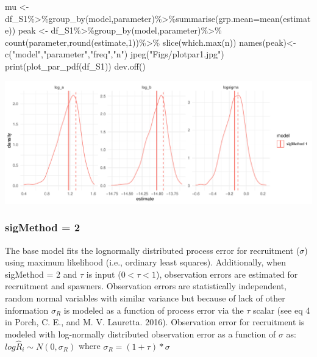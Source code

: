 \documentclass[
]{article}
\newenvironment{Shaded}{\begin{snugshade}}{\end{snugshade}}
\newcommand{\AttributeTok}[1]{\textcolor[rgb]{0.77,0.63,0.00}{#1}}
\newcommand{\DecValTok}[1]{\textcolor[rgb]{0.00,0.00,0.81}{#1}}
\newcommand{\FunctionTok}[1]{\textcolor[rgb]{0.00,0.00,0.00}{#1}}
\newcommand{\NormalTok}[1]{#1}
\newcommand{\OtherTok}[1]{\textcolor[rgb]{0.56,0.35,0.01}{#1}}
\newcommand{\SpecialCharTok}[1]{\textcolor[rgb]{0.00,0.00,0.00}{#1}}
\newcommand{\StringTok}[1]{\textcolor[rgb]{0.31,0.60,0.02}{#1}}
\begin{document}
\begin{Shaded}
\begin{Highlighting}[]
\NormalTok{  mu   }\OtherTok{\textless{}{-}}\NormalTok{ df\_S1}\SpecialCharTok{\%\textgreater{}\%}\FunctionTok{group\_by}\NormalTok{(model,parameter)}\SpecialCharTok{\%\textgreater{}\%}\FunctionTok{summarise}\NormalTok{(}\AttributeTok{grp.mean=}\FunctionTok{mean}\NormalTok{(estimate))}
\NormalTok{  peak }\OtherTok{\textless{}{-}}\NormalTok{ df\_S1}\SpecialCharTok{\%\textgreater{}\%}\FunctionTok{group\_by}\NormalTok{(model,parameter)}\SpecialCharTok{\%\textgreater{}\%}
    \FunctionTok{count}\NormalTok{(parameter,}\FunctionTok{round}\NormalTok{(estimate,}\DecValTok{1}\NormalTok{))}\SpecialCharTok{\%\textgreater{}\%}
    \FunctionTok{slice}\NormalTok{(}\FunctionTok{which.max}\NormalTok{(n))}
  \FunctionTok{names}\NormalTok{(peak)}\OtherTok{\textless{}{-}} \FunctionTok{c}\NormalTok{(}\StringTok{"model"}\NormalTok{,}\StringTok{"parameter"}\NormalTok{,}\StringTok{"freq"}\NormalTok{,}\StringTok{"n"}\NormalTok{)}
 \FunctionTok{jpeg}\NormalTok{(}\StringTok{"Figs/plotpar1.jpg"}\NormalTok{)}
 \FunctionTok{print}\NormalTok{(}\FunctionTok{plot\_par\_pdf}\NormalTok{(df\_S1))}
 \FunctionTok{dev.off}\NormalTok{()}
\end{Highlighting}
\end{Shaded}

\includegraphics{futR_demo_files/figure-latex/plot1-1.pdf}

\hypertarget{sigmethod-2-1}{%
\subsubsection{sigMethod = 2}\label{sigmethod-2-1}}

The base model fits the lognormally distributed process error for
recruitment (\(\sigma\)) using maximum likelihood (i.e., ordinary least
squares). Additionally, when sigMethod = 2 and \(\tau\) is input
(\(0<\tau<1\)), observation errors are estimated for recruitment and
spawners. Observation errors are statistically independent, random
normal variables with similar variance but because of lack of other
information \(\sigma_R\) is modeled as a function of process error via
the \(\tau\) scalar (see eq 4 in Porch, C. E., and M. V. Lauretta.
2016). Observation error for recruitment is modeled with log-normally
distributed observation error as a function of \(\sigma\) as:
\(log\hat{R}_i\sim N(0,\sigma_R)\) where \(\sigma_R=(1+\tau)*\sigma\)
\end{document}
